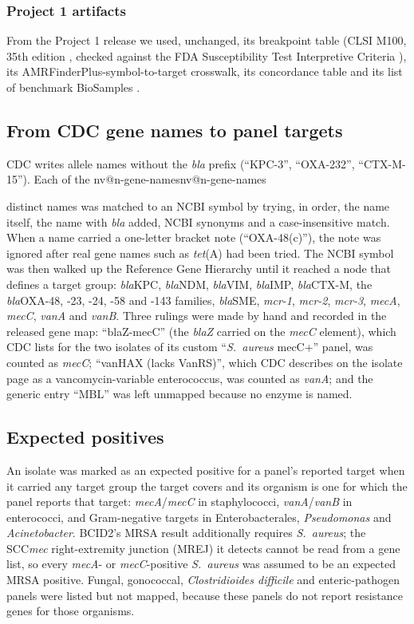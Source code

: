\documentclass[10pt,twocolumn,letterpaper]{article}
\makeatletter
\newcommand{\nv}[1]{\ifcsname nv@#1\endcsname\csname nv@#1\endcsname\else
  \PackageError{numbers}{Unknown number key: #1}{Run build_assets.py}\fi}
\newcommand{\g}[1]{\textit{#1}}  %
\newcommand{\sau}{\textit{S.~aureus}}
\makeatother
\begin{document}
\subsubsection{Project 1 artifacts}
From the Project 1 release we used, unchanged, its breakpoint table (CLSI M100, 35th edition \cite{clsi2025}, checked
against the FDA Susceptibility Test Interpretive Criteria \cite{fdastic}), its AMRFinderPlus-symbol-to-target crosswalk,
its concordance table and its list of benchmark BioSamples \cite{project1}.

\subsection{From CDC gene names to panel targets}

CDC writes allele names without the \textit{bla} prefix (``KPC-3'', ``OXA-232'', ``CTX-M-15''). Each of the
\nv{n-gene-names} distinct names was matched to an NCBI symbol by trying, in order, the name itself, the name with
\textit{bla} added, NCBI synonyms and a case-insensitive match. When a name carried a one-letter bracket note
(``OXA-48(c)''), the note was ignored after real gene names such as \textit{tet}(A) had been tried. The NCBI symbol was
then walked up the Reference Gene Hierarchy until it reached a node that defines a target group: \textit{bla}KPC,
\textit{bla}NDM, \textit{bla}VIM, \textit{bla}IMP, \textit{bla}CTX-M, the \textit{bla}OXA-48, -23, -24, -58 and -143
families, \textit{bla}SME, \g{mcr-1}, \g{mcr-2}, \g{mcr-3}, \g{mecA}, \g{mecC}, \g{vanA} and \g{vanB}. Three rulings were
made by hand and recorded in the released gene map: ``blaZ-mecC'' (the \textit{blaZ} carried on the \g{mecC} element),
which CDC lists for the two isolates of its custom ``\sau{} mecC+'' panel, was counted as \g{mecC}; ``vanHAX (lacks
VanRS)'', which CDC describes on the isolate page as a vancomycin-variable enterococcus, was counted as \g{vanA}; and the
generic entry ``MBL'' was left unmapped because no enzyme is named.

\subsection{Expected positives}

An isolate was marked as an expected positive for a panel's reported target when it carried any target group the
target covers and its organism is one for which the panel reports that target: \g{mecA}/\g{mecC} in staphylococci,
\g{vanA}/\g{vanB} in enterococci, and Gram-negative targets in Enterobacterales, \textit{Pseudomonas} and
\textit{Acinetobacter}. BCID2's MRSA result additionally requires \sau{}; the SCC\textit{mec} right-extremity junction
(MREJ) it detects cannot be read from a gene list, so every \g{mecA}- or \g{mecC}-positive \sau{} was assumed to be an
expected MRSA positive. Fungal, gonococcal, \textit{Clostridioides difficile} and enteric-pathogen panels were listed but
not mapped, because these panels do not report resistance genes for those organisms.
\end{document}
